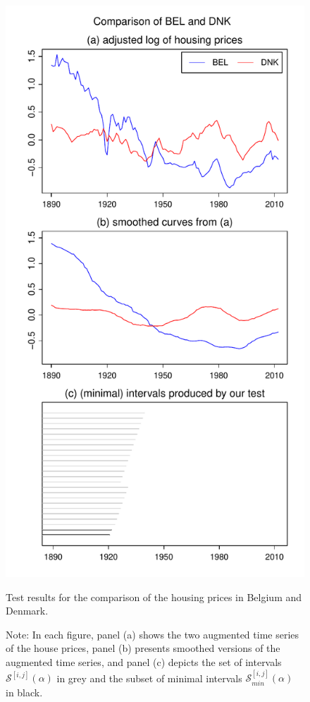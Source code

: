\documentclass[a4paper,12pt]{article}
\begin{document}
\begin{figure}[b!]
\hspace{0.25cm}
\begin{minipage}[t]{0.49\textwidth}
\includegraphics[width=\textwidth]{Plots/hp_BEL_vs_DNK}
\caption{Test results for the comparison of the housing prices in Belgium and Denmark.}\label{fig:hp:Belgium:Denmark}
\end{minipage}
\caption*{Note: In each figure, panel (a) shows the two augmented time series of the house prices, panel (b) presents smoothed versions of the augmented time series, and panel (c) depicts the set of intervals $\mathcal{S}^{[i,j]}(\alpha)$ in grey and the subset of minimal intervals $\mathcal{S}^{[i,j]}_{min}(\alpha)$ in black.}
\end{figure}
\end{document}

